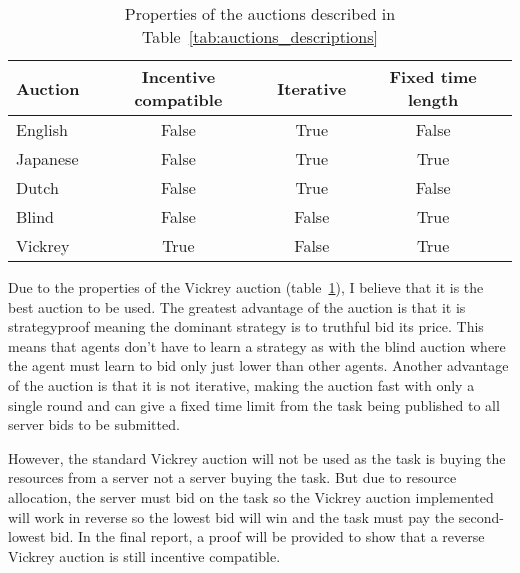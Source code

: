 \begin{table}[h]
    \centering
    \begin{tabular}{|l|c|c|c|} \hline
        Auction & Incentive compatible & Iterative & Fixed time length\\ \hline
        English & False & True & False \\ \hline
        Japanese & False & True & True \\ \hline
        Dutch & False & True & False \\ \hline
        Blind & False & False & True \\ \hline
        Vickrey & True & False & True \\ \hline
    \end{tabular}
    \caption{Properties of the auctions described in Table~\ref{tab:auctions_descriptions}}
    \label{tab:auction_properties}
\end{table}

Due to the properties of the Vickrey auction (table~\ref{tab:auction_properties}), I believe that it is the best auction to be used.
The greatest advantage of the auction is that it is strategyproof meaning the dominant strategy is to truthful bid its price.
This means that agents don't have to learn a strategy as with the blind auction where the agent must learn to bid only just
lower than other agents. Another advantage of the auction is that it is not iterative, making the auction fast with only a single
round and can give a fixed time limit from the task being published to all server bids to be submitted.

However, the standard Vickrey auction will not be used as the task is buying the resources from a server
not a server buying the task. But due to resource allocation, the server must bid on the task so the Vickrey auction implemented
will work in reverse so the lowest bid will win and the task must pay the second-lowest bid. In the final report, a proof will be provided
to show that a reverse Vickrey auction is still incentive compatible.

